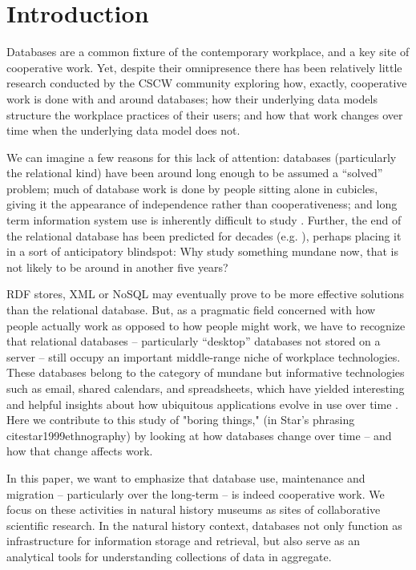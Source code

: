 \section{Introduction}

Databases are a common fixture of the contemporary workplace, and a key site of cooperative work. Yet, despite their omnipresence there has been relatively little research conducted by the CSCW community exploring how, exactly, cooperative work is done with and around databases;  how their underlying data models structure the workplace practices of their users; and how that work changes over time when the underlying data model does not. 

We can imagine a few reasons for this lack of attention: databases (particularly the relational kind) have been around long enough to be assumed a “solved” problem; much of database work is done by people sitting alone in cubicles, giving it the appearance of independence rather than cooperativeness; and long term information system use is inherently difficult to study \cite{Pipek_2002}. Further, the end of the relational database has been predicted for decades (e.g. \cite{Atzeni_2013}), perhaps placing it in a sort of anticipatory blindspot: Why study something mundane now, that is not likely to be around in another five years? 

RDF stores, XML or NoSQL may eventually prove to be more effective solutions than the relational database. But, as a pragmatic field concerned with how people actually work as opposed to how people might work, we have to recognize that relational databases – particularly “desktop” databases not stored on a server – still occupy an important middle-range niche of workplace technologies. These databases belong to the category of mundane but informative technologies such as email, shared calendars, and spreadsheets, which have yielded interesting and helpful insights about how ubiquitous applications evolve in use over time \cite{bellotti2005quality, palen1999social, nardi1991twinkling}. Here we contribute to this study of "boring things," (in Star's phrasing cite{star1999ethnography}) by looking at how databases change over time -- and how that change affects work.

In this paper, we want to emphasize that database use, maintenance and migration – particularly over the long-term – is indeed cooperative work. We focus on these activities in natural history museums as sites of collaborative scientific research. In the natural history context, databases not only function as infrastructure for information storage and retrieval, but also serve as an analytical tools for understanding collections of data in aggregate. 

